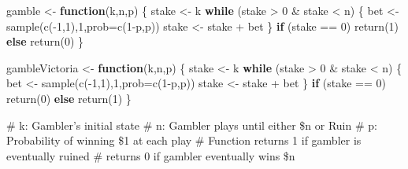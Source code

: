 \documentclass[
]{article}
\newenvironment{Shaded}{\begin{snugshade}}{\end{snugshade}}
\newcommand{\AttributeTok}[1]{\textcolor[rgb]{0.77,0.63,0.00}{#1}}
\newcommand{\ControlFlowTok}[1]{\textcolor[rgb]{0.13,0.29,0.53}{\textbf{#1}}}
\newcommand{\DecValTok}[1]{\textcolor[rgb]{0.00,0.00,0.81}{#1}}
\newcommand{\FunctionTok}[1]{\textcolor[rgb]{0.00,0.00,0.00}{#1}}
\newcommand{\NormalTok}[1]{#1}
\newcommand{\OtherTok}[1]{\textcolor[rgb]{0.56,0.35,0.01}{#1}}
\newcommand{\SpecialCharTok}[1]{\textcolor[rgb]{0.00,0.00,0.00}{#1}}
\begin{document}
\begin{Shaded}
\begin{Highlighting}[]
\NormalTok{gamble }\OtherTok{\textless{}{-}} \ControlFlowTok{function}\NormalTok{(k,n,p) \{}
\NormalTok{    stake }\OtherTok{\textless{}{-}}\NormalTok{ k}
    \ControlFlowTok{while}\NormalTok{ (stake }\SpecialCharTok{\textgreater{}} \DecValTok{0} \SpecialCharTok{\&}\NormalTok{ stake }\SpecialCharTok{\textless{}}\NormalTok{ n) \{}
\NormalTok{        bet }\OtherTok{\textless{}{-}} \FunctionTok{sample}\NormalTok{(}\FunctionTok{c}\NormalTok{(}\SpecialCharTok{{-}}\DecValTok{1}\NormalTok{,}\DecValTok{1}\NormalTok{),}\DecValTok{1}\NormalTok{,}\AttributeTok{prob=}\FunctionTok{c}\NormalTok{(}\DecValTok{1}\SpecialCharTok{{-}}\NormalTok{p,p))}
\NormalTok{        stake }\OtherTok{\textless{}{-}}\NormalTok{ stake }\SpecialCharTok{+}\NormalTok{ bet}
\NormalTok{    \}}
    \ControlFlowTok{if}\NormalTok{ (stake }\SpecialCharTok{==} \DecValTok{0}\NormalTok{) }\FunctionTok{return}\NormalTok{(}\DecValTok{1}\NormalTok{) }\ControlFlowTok{else} \FunctionTok{return}\NormalTok{(}\DecValTok{0}\NormalTok{)}
\NormalTok{\} }

\NormalTok{gambleVictoria }\OtherTok{\textless{}{-}} \ControlFlowTok{function}\NormalTok{(k,n,p) \{}
\NormalTok{    stake }\OtherTok{\textless{}{-}}\NormalTok{ k}
    \ControlFlowTok{while}\NormalTok{ (stake }\SpecialCharTok{\textgreater{}} \DecValTok{0} \SpecialCharTok{\&}\NormalTok{ stake }\SpecialCharTok{\textless{}}\NormalTok{ n) \{}
\NormalTok{        bet }\OtherTok{\textless{}{-}} \FunctionTok{sample}\NormalTok{(}\FunctionTok{c}\NormalTok{(}\SpecialCharTok{{-}}\DecValTok{1}\NormalTok{,}\DecValTok{1}\NormalTok{),}\DecValTok{1}\NormalTok{,}\AttributeTok{prob=}\FunctionTok{c}\NormalTok{(}\DecValTok{1}\SpecialCharTok{{-}}\NormalTok{p,p))}
\NormalTok{        stake }\OtherTok{\textless{}{-}}\NormalTok{ stake }\SpecialCharTok{+}\NormalTok{ bet}
\NormalTok{    \}}
    \ControlFlowTok{if}\NormalTok{ (stake }\SpecialCharTok{==} \DecValTok{0}\NormalTok{) }\FunctionTok{return}\NormalTok{(}\DecValTok{0}\NormalTok{) }\ControlFlowTok{else} \FunctionTok{return}\NormalTok{(}\DecValTok{1}\NormalTok{)}
\NormalTok{    \} }
\end{Highlighting}
\end{Shaded}

\# k: Gambler's initial state \# n: Gambler plays until either \$n or
Ruin \# p: Probability of winning \$1 at each play \# Function returns 1
if gambler is eventually ruined \# returns 0 if gambler eventually wins
\$n
\end{document}
